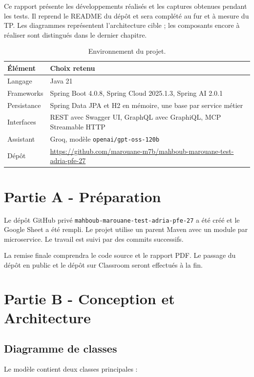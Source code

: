 \documentclass[11pt,a4paper]{report}
\begin{document}
Ce rapport présente les développements réalisés et les captures obtenues pendant
les tests. Il reprend le README du dépôt et sera complété au fur et à mesure du TP.
Les diagrammes représentent l'architecture cible ; les composants encore à réaliser
sont distingués dans le dernier chapitre.

\begin{table}[H]\centering\small
\begin{tabularx}{\linewidth}{lX}\toprule
Élément & Choix retenu\\\midrule
Langage & Java 21\\
Frameworks & Spring Boot 4.0.8, Spring Cloud 2025.1.3, Spring AI 2.0.1\\
Persistance & Spring Data JPA et H2 en mémoire, une base par service métier\\
Interfaces & REST avec Swagger UI, GraphQL avec GraphiQL, MCP Streamable HTTP\\
Assistant & Groq, modèle \texttt{openai/gpt-oss-120b}\\
Dépôt & \url{https://github.com/marouane-m7b/mahboub-marouane-test-adria-pfe-27}\\\bottomrule
\end{tabularx}\caption{Environnement du projet.}\end{table}
\clearpage


\chapter{Partie A - Préparation}

Le dépôt GitHub privé \nolinkurl{mahboub-marouane-test-adria-pfe-27} a été créé et le Google Sheet a été rempli. Le projet utilise un parent Maven avec un module par microservice. Le travail est suivi par des commits successifs.

La remise finale comprendra le code source et le rapport PDF. Le passage du dépôt en public et le dépôt sur Classroom seront effectués à la fin.

\chapter{Partie B - Conception et Architecture}

\section{Diagramme de classes}

Le modèle contient deux classes principales :
\end{document}
